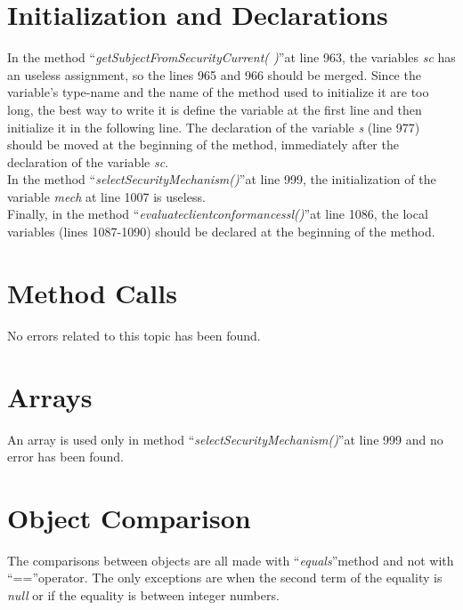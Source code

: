 \documentclass[\mainpath/main]{subfiles}
\begin{document}
\section{Initialization and Declarations}
\label{CodeInspectionChecklist:InitializationandDeclarations}
In the method \textquotedblleft \textit{getSubjectFromSecurityCurrent( )}\textquotedblright at line 963, the variables \textit{sc} has an useless assignment, so the lines 965 and 966 should be merged. Since the variable's type-name and the name of the method used to initialize it are too long, the best way to write it is define the variable at the first line and then initialize it in the following line.
The declaration of the variable \textit{s} (line 977) should be moved at the beginning of the method, immediately after the declaration of the variable \textit{sc}.\\
In the method \textquotedblleft \textit{selectSecurityMechanism(\textellipsis)}\textquotedblright at line 999, the initialization of the variable \textit{mech} at line 1007 is useless.\\
Finally, in the method \textquotedblleft \textit{evaluate\textunderscore client\textunderscore conformance\textunderscore ssl(\textellipsis)}\textquotedblright  at line 1086, the local variables (lines 1087-1090) should be declared at the beginning of the method.

\section{Method Calls}
\label{CodeInspectionChecklist:MethodCalls}
No errors related to this topic has been found.

\section{Arrays}
\label{CodeInspectionChecklist:Arrays}
An array is used only in method \textquotedblleft \textit{selectSecurityMechanism(\textellipsis)}\textquotedblright at line 999 and no error has been found.

\section{Object Comparison}
\label{CodeInspectionChecklist:ObjectComparison}
The comparisons between objects are all made with \textquotedblleft \textit{equals}\textquotedblright method and not with \textquotedblleft ==\textquotedblright operator. The only exceptions are when the second term of the equality is \textit{null} or if the equality is between integer numbers.
\end{document}
